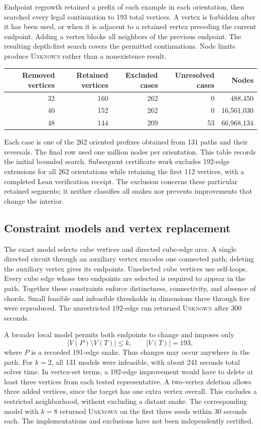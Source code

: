 \documentclass[11pt,a4paper]{article}
\theoremstyle{definition}
\theoremstyle{remark}
\begin{document}
Endpoint regrowth retained a prefix of each example in each orientation, then searched every legal continuation to 193 total vertices. A vertex is forbidden after it has been used, or when it is adjacent to a retained vertex preceding the current endpoint. Adding a vertex blocks all neighbors of the previous endpoint. The resulting depth-first search covers the permitted continuations. Node limits produce \textsc{Unknown} rather than a nonexistence result.
\begin{center}\begin{tabular}{rrrrr}
\toprule
Removed vertices & Retained vertices & Excluded cases & Unresolved cases & Nodes\\\midrule
32&160&262&0&488,450\\
40&152&262&0&16,561,030\\
48&144&209&53&66,968,134\\\bottomrule
\end{tabular}\end{center}
Each case is one of the 262 oriented prefixes obtained from 131 paths and their reversals. The final row used one million nodes per orientation. This table records the initial bounded search. Subsequent certificate work excludes 192-edge extensions for all 262 orientations while retaining the first 112 vertices, with a completed Lean verification receipt. The exclusion concerns these particular retained segments; it neither classifies all snakes nor prevents improvements that change the interior.

\subsection{Constraint models and vertex replacement}
The exact model selects cube vertices and directed cube-edge arcs. A single directed circuit through an auxiliary vertex encodes one connected path; deleting the auxiliary vertex gives its endpoints. Unselected cube vertices use self-loops. Every cube edge whose two endpoints are selected is required to appear in the path. Together these constraints enforce distinctness, connectivity, and absence of chords. Small feasible and infeasible thresholds in dimensions three through five were reproduced. The unrestricted 192-edge run returned \textsc{Unknown} after 300 seconds.

A broader local model permits both endpoints to change and imposes only
\[
|V(P)\setminus V(T)|\le k,\qquad |V(T)|=193,
\]
where $P$ is a recorded 191-edge snake. Thus changes may occur anywhere in the path. For $k=2$, all 131 models were infeasible, with about 241 seconds total solver time. In vertex-set terms, a 192-edge improvement would have to delete at least three vertices from each tested representative. A two-vertex deletion allows three added vertices, since the target has one extra vertex overall. This excludes a restricted neighborhood, without excluding a distant snake. The corresponding model with $k=8$ returned \textsc{Unknown} on the first three seeds within 30 seconds each. The implementations and exclusions have not been independently certified.
\end{document}
